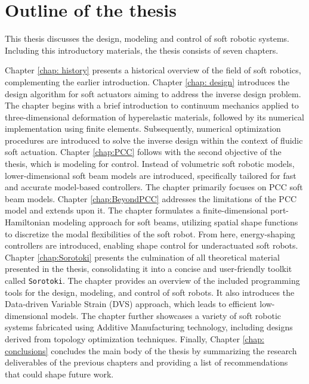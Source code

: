 \vspace{-3mm}
\section{Outline of the thesis}
\label{sec:intro:outline}
This thesis discusses the design, modeling and control of soft robotic systems. Including this introductory materials, the thesis consists of seven chapters. 

Chapter \ref{chap: history} presents a historical overview of the field of soft robotics, complementing the earlier introduction. Chapter \ref{chap: design} introduces the design algorithm for soft actuators aiming to address the inverse design problem. The chapter begins with a brief introduction to continuum mechanics applied to three-dimensional deformation of hyperelastic materials, followed by its numerical implementation using finite elements. Subsequently, numerical optimization procedures are introduced to solve the inverse design within the context of fluidic soft actuation. Chapter \ref{chap:PCC} follows with the second objective of the thesis, which is modeling for control. Instead of volumetric soft robotic models, lower-dimensional soft beam models are introduced, specifically tailored for fast and accurate model-based controllers. The chapter primarily focuses on PCC soft beam models. Chapter \ref{chap:BeyondPCC} addresses the limitations of the PCC model and extends upon it. The chapter formulates a finite-dimensional port-Hamiltonian modeling approach for soft beams, utilizing spatial shape functions to discretize the modal flexibilities of the soft robot. From here, energy-shaping controllers are introduced, enabling shape control for underactuated soft robots. Chapter \ref{chap:Sorotoki} presents the culmination of all theoretical material presented in the thesis, consolidating it into a concise and user-friendly toolkit called \texttt{Sorotoki}. The chapter provides an overview of the included programming tools for the design, modeling, and control of soft robots. It also introduces the Data-driven Variable Strain (DVS) approach, which leads to efficient low-dimensional models. The chapter further showcases a variety of soft robotic systems fabricated using Additive Manufacturing technology, including designs derived from topology optimization techniques. Finally, Chapter \ref{chap: conclusions} concludes the main body of the thesis by summarizing the research deliverables of the previous chapters and providing a list of recommendations that could shape future work.
\\

